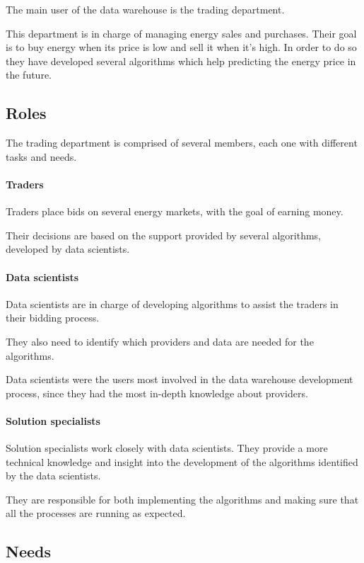 The main user of the data warehouse is the trading department.

This department is in charge of managing energy sales and purchases.
Their goal is to buy energy when its price is low and sell it when it's high.
In order to do so they have developed several algorithms which help predicting the energy price in the future.

\subsection{Roles}
    The trading department is comprised of several members, each one with different tasks and needs.
    
    \paragraph{Traders}
        Traders place bids on several energy markets, with the goal of earning money.
        
        Their decisions are based on the support provided by several algorithms, developed by data scientists.
    \paragraph{Data scientists}
        Data scientists are in charge of developing algorithms to assist the traders in their bidding process.
        
        They also need to identify which providers and data are needed for the algorithms.
        
        Data scientists were the users most involved in the data warehouse development process, since they had the most in-depth knowledge about providers.
    \paragraph{Solution specialists}
        Solution specialists work closely with data scientists.
        They provide a more technical knowledge and insight into the development of the algorithms identified by the data scientists.
        
        They are responsible for both implementing the algorithms and making sure that all the processes are running as expected.

\subsection{Needs}
